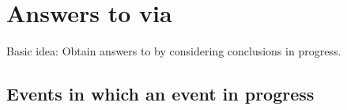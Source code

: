 \documentclass[10pt]{article}
\begin{document}
\section{Answers to \qWhy{} via }
\label{sec:answers-qwhy}

\begin{note}
  Basic idea: Obtain answers to \qWhy{} by considering conclusions in progress.
\end{note}

\begin{comment}
  Part of why this is interesting.
  Maybe.
  No subjunctives, with the exception of thinking about events in progress.
  If you can do events in progress without subjunctives, then, things go through.
  Even projections.
  These talk about possibility, and entail various subjunctives, but that's about it.
\end{comment}


\subsection{Events in which an event in progress}
\label{sec:events-progress}

\begin{note}
  \hfill\hspace{\dimexpr-\fboxrule-\fboxsep\relax}\hfill
\end{note}
\end{document}
